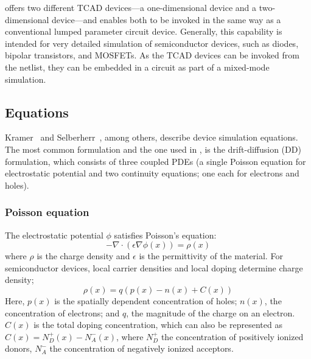 \Xyce{} offers two different TCAD devices---a one-dimensional 
device and a two-dimensional device---and enables both to be invoked in the 
same way as a conventional lumped parameter circuit device. Generally, this 
capability is intended for very detailed simulation of semiconductor devices, 
such as diodes, bipolar transistors, and MOSFETs. As the \Xyce{} TCAD devices can
be invoked from the netlist, they can be embedded in a circuit as part of
a mixed-mode simulation.

\subsection{Equations}
Kramer~\cite{Kramer} and Selberherr~\cite{selberherr}, among others, describe 
device simulation equations. The most common formulation and the one used in 
\Xyce{}, is the drift-diffusion (DD) formulation, which consists of three coupled
PDEs (a single Poisson equation for electrostatic potential and two continuity
equations; one each for electrons and holes).

\subsubsection{Poisson equation}
The electrostatic potential $\phi$ satisfies Poisson's equation:
\begin{equation}
  -\nabla \cdot \left(\epsilon \nabla \phi(x) \right) = \rho(x) \label{poisson1}
\end{equation}
where $\rho$ is the charge density and $\epsilon$ is the permittivity of the
material.  For semiconductor devices, local carrier densities and local doping determine charge density;
\begin{equation}
  \rho(x) = q(p(x)-n(x)+C(x)) \label{poisson2}
\end{equation} 
Here, $p(x)$ is the spatially dependent concentration of holes; $n(x)$, the
concentration of electrons; and $q$, the magnitude of the charge on an electron.
$C(x)$ is the total doping concentration, which can also be represented as
$C(x)=N^+_D(x)-N^-_A(x)$, where $N^+_D$ the concentration of positively ionized
donors, $N^-_A$ the concentration of negatively ionized acceptors.

